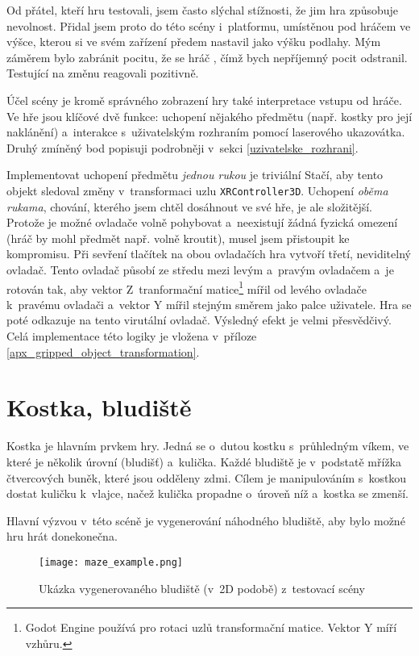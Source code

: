 Od přátel, kteří hru testovali, jsem často slýchal stížnosti, že jim hra způsobuje nevolnost. Přidal jsem proto do této scény i~platformu, umístěnou pod hráčem ve výšce, kterou si ve svém zařízení předem nastavil jako výšku podlahy. Mým záměrem bylo zabránit pocitu, že se hráč , čímž bych nepříjemný pocit odstranil. Testující na změnu reagovali pozitivně. 

Účel scény je kromě správného zobrazení hry také interpretace vstupu od hráče. Ve hře jsou klíčové dvě funkce: uchopení nějakého předmětu (např. kostky pro její naklánění) a~interakce s~uživatelským rozhraním pomocí laserového ukazovátka. Druhý zmíněný bod popisuji podrobněji v~sekci \ref{uzivatelske_rozhrani}.

Implementovat uchopení předmětu \textit{jednou rukou} je triviální \poml Stačí, aby tento objekt sledoval změny v~transformaci uzlu \texttt{XRController3D}. Uchopení \textit{oběma rukama}, chování, kterého jsem chtěl dosáhnout ve své hře, je ale složitější. Protože je možné ovladače volně pohybovat a~neexistují žádná fyzická omezení (hráč by mohl předmět např. volně kroutit), musel jsem přistoupit ke kompromisu. Při sevření tlačítek na obou ovladačích hra vytvoří třetí, neviditelný ovladač. Tento ovladač působí ze středu mezi levým a~pravým ovladačem a~je rotován tak, aby vektor Z~tranformační matice\footnote{Godot Engine používá pro rotaci uzlů transformační matice. Vektor Y míří vzhůru.} mířil od levého ovladače k~pravému ovladači a~vektor Y mířil stejným směrem jako palce uživatele. Hra se poté odkazuje na tento virutální ovladač. Výsledný efekt je velmi přesvědčivý. Celá implementace této logiky je vložena v~příloze \ref{apx_gripped_object_transformation}.

\section{Kostka, bludiště}

Kostka je hlavním prvkem hry. Jedná se o~dutou kostku s~průhledným víkem, ve které je několik úrovní (bludišť) a~kulička. Každé bludiště je v~podstatě mřížka čtvercových buněk, které jsou odděleny zdmi. Cílem je manipulováním s~kostkou dostat kuličku k~vlajce, načež kulička propadne o~úroveň níž a~kostka se zmenší.

Hlavní výzvou v~této scéně je vygenerování náhodného bludiště, aby bylo možné hru hrát donekonečna.

\begin{figure}[H]
  \centering
  \texttt{[image: maze\_example.png]}
  \caption{Ukázka vygenerovaného bludiště (v~2D podobě) z~testovací scény}
  \label{maze_example}
\end{figure}


